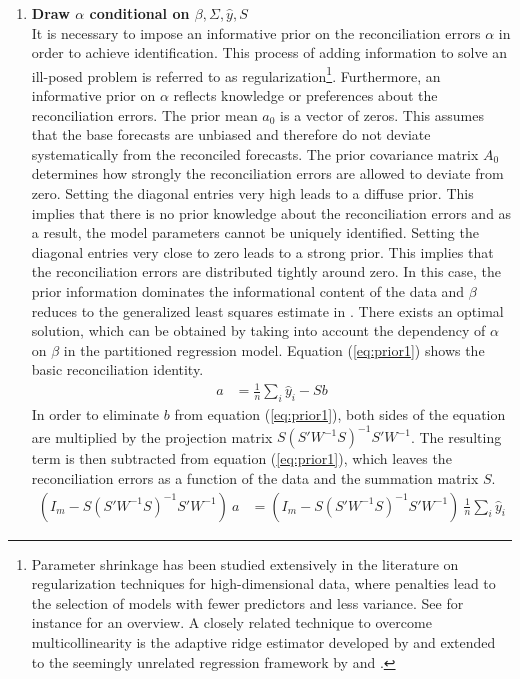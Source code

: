 \documentclass[a4paper,fleqn,11pt]{article}
\begin{document}
\begin{enumerate}
\item \textbf{Draw $\alpha$ conditional on $\beta,\Sigma,\hat{y},S$}\\
It is necessary to impose an informative prior on the reconciliation errors $\alpha$ in order to achieve identification. This process of adding information to solve an ill-posed problem is referred to as regularization\footnote{Parameter shrinkage  has been studied extensively in the literature on regularization techniques for high-dimensional data, where penalties lead to the selection of models with fewer predictors and less variance. See for instance \cite{Polson2010} for an overview. A closely related technique to overcome multicollinearity is the adaptive ridge estimator developed by \cite{Brown1980} and extended to the seemingly unrelated regression framework by \cite{Haitovsky1987} and \cite{Firinguetti1997}.}. Furthermore, an informative prior on $\alpha$ reflects knowledge or preferences about the reconciliation errors. The prior mean $a_0$ is a vector of zeros. This assumes that the base forecasts are unbiased and therefore do not deviate systematically from the reconciled forecasts. The prior covariance matrix $A_0$ determines how strongly the reconciliation errors are allowed to deviate from zero. Setting the diagonal entries very high leads to a diffuse prior. This implies that there is no prior knowledge about the reconciliation errors and as a result, the model parameters cannot be uniquely identified. Setting the diagonal entries very close to zero leads to a strong prior. This implies that the reconciliation errors are distributed tightly around zero. In this case, the prior information dominates the informational content of the data and $\beta$ reduces to the generalized least squares estimate in \cite{Hyndman2016}. There exists an optimal solution, which can be obtained by taking into account the dependency of $\alpha$ on $\beta$ in the partitioned regression model. Equation (\ref{eq:prior1}) shows the basic reconciliation identity.
\begin{align}
	\label{eq:prior1}
	a &= \frac{1}{n}\sum_i \hat{y}_i - Sb
\end{align}
In order to eliminate $b$ from equation (\ref{eq:prior1}), both sides of the equation are multiplied by the projection matrix $S(S'W^{-1}S)^{-1}S'W^{-1}$. The resulting term is then subtracted from equation (\ref{eq:prior1}), which leaves the reconciliation errors as a function of the data and the summation matrix $S$.
\begin{align}
	\label{eq:prior2}
	(I_m - S(S'W^{-1}S)^{-1}S'W^{-1})\ a &= (I_m - S(S'W^{-1}S)^{-1}S'W^{-1})\ \frac{1}{n}\sum_i \hat{y}_i  

\end{align}
\end{enumerate}
\end{document}
